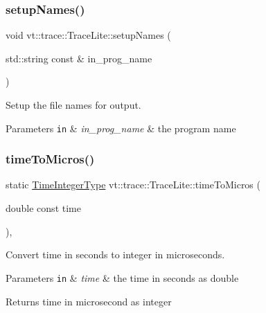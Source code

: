 \subsubsection{\texorpdfstring{setup\+Names()}{setupNames()}}
{\footnotesize\ttfamily void vt\+::trace\+::\+Trace\+Lite\+::setup\+Names (\begin{DoxyParamCaption}\item[{std\+::string const \&}]{in\+\_\+prog\+\_\+name }\end{DoxyParamCaption})}



Setup the file names for output. 


\begin{DoxyParams}[1]{Parameters}
\mbox{\tt in}  & {\em in\+\_\+prog\+\_\+name} & the program name \\
\hline
\end{DoxyParams}
\mbox{\label{structvt_1_1trace_1_1_trace_lite_a54f5dd2119d3de0bb5df60d7986ea7aa}} 
\subsubsection{\texorpdfstring{time\+To\+Micros()}{timeToMicros()}}
{\footnotesize\ttfamily static \hyperlink{structvt_1_1trace_1_1_trace_lite_a301955b0e2e8d76ca5974c10be8125c4}{Time\+Integer\+Type} vt\+::trace\+::\+Trace\+Lite\+::time\+To\+Micros (\begin{DoxyParamCaption}\item[{double const}]{time }\end{DoxyParamCaption})\hspace{0.3cm}{\ttfamily [inline]}, {\ttfamily [static]}}



Convert time in seconds to integer in microseconds. 


\begin{DoxyParams}[1]{Parameters}
\mbox{\tt in}  & {\em time} & the time in seconds as double\\
\hline
\end{DoxyParams}
\begin{DoxyReturn}{Returns}
time in microsecond as integer 
\end{DoxyReturn}
\mbox{\label{structvt_1_1trace_1_1_trace_lite_aaf2192758f67bc57ab66766523bd96ad}} 
